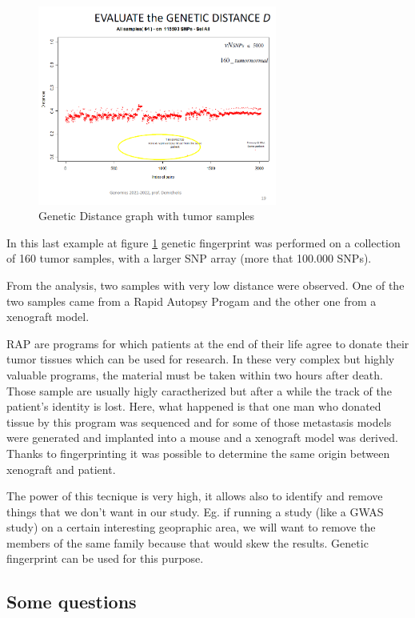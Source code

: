 \begin{figure}
	\centering
	\includegraphics[width=0.7\textwidth]{Distance3.PNG}
	\caption{\label{fig:Distance3}Genetic Distance graph with tumor samples}
\end{figure}

\bigskip
In this last example at figure \ref{fig:Distance3} genetic fingerprint was performed on a collection of 160  tumor samples, with a larger SNP array (more that 100.000 SNPs).  

From the analysis, two samples with very low distance were observed. One of the two samples came from a 
Rapid Autopsy Progam and the other one from a xenograft model. 

RAP are programs for which patients at the end of their life agree to donate their tumor tissues which can be used for research. In these very complex but highly valuable programs, the material must be taken within two hours after death. Those sample are usually higly caractherized but after a while the track of the patient's identity is lost. 
Here, what happened is that one man who donated tissue by this program was sequenced and for some of those metastasis models were generated and implanted into a mouse and a xenograft model was derived. Thanks to fingerprinting it was possible to determine the same origin between xenograft and patient. 

The power of this tecnique is very high, it allows also to identify and remove things that we don't want in our study. Eg. if running a study (like a GWAS study) on a certain interesting geopraphic area, we will want to remove the members of the same family because that would skew the results. Genetic fingerprint can be used for this purpose.

\subsection*{Some questions}

